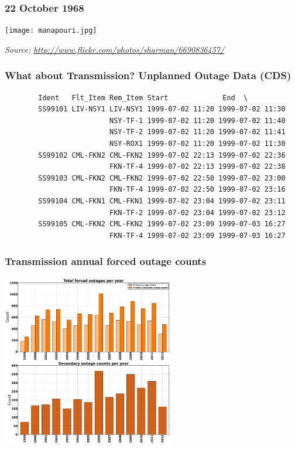 \documentclass[aspectratio=169]{beamer}
\begin{document}
\frame
{\frametitle{22 October 1968}
\begin{center}
\texttt{[image: manapouri.jpg]} 
\end{center}
\begin{flushright}
\tiny \emph{Source: \url{http://www.flickr.com/photos/sharman/6690836457/}}
\end{flushright}

}



\begin{frame}[fragile]
  \frametitle{What about Transmission? Unplanned Outage Data (CDS)}
  \begin{verbatim}
        Ident   Flt_Item Rem_Item Start             End  \                                            
        SS99101 LIV-NSY1 LIV-NSY1 1999-07-02 11:20 1999-07-02 11:30   
                         NSY-TF-1 1999-07-02 11:20 1999-07-02 11:40   
                         NSY-TF-2 1999-07-02 11:20 1999-07-02 11:41   
                         NSY-ROX1 1999-07-02 11:20 1999-07-02 11:30   
        SS99102 CML-FKN2 CML-FKN2 1999-07-02 22:13 1999-07-02 22:36   
                         FKN-TF-4 1999-07-02 22:13 1999-07-02 22:38   
        SS99103 CML-FKN2 CML-FKN2 1999-07-02 22:50 1999-07-02 23:00   
                         FKN-TF-4 1999-07-02 22:50 1999-07-02 23:16   
        SS99104 CML-FKN1 CML-FKN1 1999-07-02 23:04 1999-07-02 23:11   
                         FKN-TF-2 1999-07-02 23:04 1999-07-02 23:12   
        SS99105 CML-FKN2 CML-FKN2 1999-07-02 23:09 1999-07-03 16:27   
                         FKN-TF-4 1999-07-02 23:09 1999-07-03 16:27   

  \end{verbatim}

\end{frame}

\frame
{\frametitle{Transmission annual forced outage counts}
\begin{center}
\includegraphics[width=7.5cm]{./notebooks/125_years_of_data_files/125_years_of_data_fig_07.pdf} 
\end{center}
}
\end{document}
